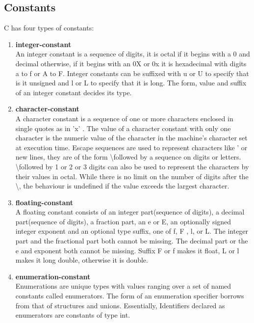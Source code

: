 \documentclass[12pt]{article}
\begin{document}
\subsection{Constants}
C has four types of constants:
\begin{enumerate}
\item \textbf{integer-constant}\\
An integer constant is a sequence of digits, it is octal if it begins with a 0 and decimal otherwise, if it begins with an 0X or 0x it is hexadecimal with digits a to f or A to F. Integer constants can be suffixed with u or U to specify that is it unsigned and l or L to specify that it is long. The form, value and suffix of an integer constant decides its type.
\item \textbf{character-constant}\\
A character constant is a sequence of one or more characters enclosed in single quotes as in 'x' . The value of a character constant with only one character is the numeric value of the
character in the machine's character set at execution time. Escape sequences are used to represent characters like ' or new lines, they are of the form \textbackslash \space followed by a sequence on digits or letters. \textbackslash \space followed by 1 or 2 or 3 digits can also be used to represent the characters by their values in octal. While there is no limit on the number of digits after the \textbackslash \space , the behaviour is undefined if the value exceeds the largest character.
\item \textbf{floating-constant}\\
A floating constant consists of an integer part(sequence of digits), a decimal part(sequence of digits), a fraction part, an e or E, an optionally signed integer exponent and an optional type suffix, one of f, F , l, or L. The integer part and the fractional part both cannot be missing. The decimal part or the e and exponent both cannot be missing. Suffix F or f makes it float, L or l makes it long double, otherwise it is double.

\item \textbf{enumeration-constant}\\
Enumerations are unique types with values ranging over a set of named constants called
enumerators. The form of an enumeration specifier borrows from that of structures and unions. Essentially, Identifiers declared as enumerators are constants of type int.

\end{enumerate}
\end{document}
